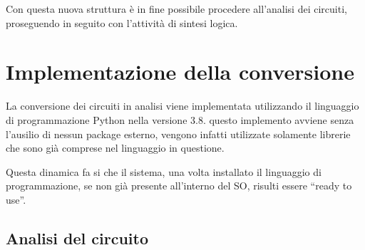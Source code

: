\documentclass[italian,]{book}
\begin{document}
Con questa nuova struttura è in fine possibile procedere all'analisi dei circuiti, proseguendo in seguito con l'attività di sintesi logica.

\hypertarget{implementazione-della-conversione}{%
\section{Implementazione della conversione}\label{implementazione-della-conversione}}

La conversione dei circuiti in analisi viene implementata utilizzando il linguaggio di programmazione Python nella versione 3.8. questo implemento avviene senza l'ausilio di nessun package esterno, vengono infatti utilizzate solamente librerie che sono già comprese nel linguaggio in questione.

Questa dinamica fa si che il sistema, una volta installato il linguaggio di programmazione, se non già presente all'interno del SO, risulti essere ``ready to use''.

\newpage

\hypertarget{analisi-del-circuito}{%
\subsection{Analisi del circuito}\label{analisi-del-circuito}}
\end{document}

